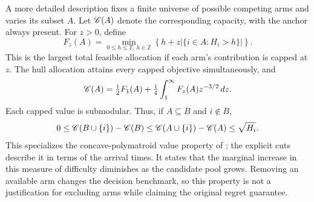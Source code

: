 A more detailed description fixes a finite universe of possible competing arms and varies its subset $A$. Let $\mathscr C(A)$ denote the corresponding capacity, with the anchor always present. For $z>0$, define
\begin{equation}\label{eq:cut-main}
 F_z(A)=\min_{0\le h\le T,\ h\in\mathbb Z}
 \left\{h+z|\{i\in A:H_i>h\}|\right\}.
\end{equation}
This is the largest total feasible allocation if each arm's contribution is capped at $z$. The hull allocation attains every capped objective simultaneously, and
\begin{equation}\label{eq:integral-main}
 \mathscr C(A)=\tfrac12F_1(A)+\tfrac14\int_1^\infty F_z(A)z^{-3/2}\,dz.
\end{equation}
Each capped value is submodular. Thus, if $A\subseteq B$ and $i\notin B$,
\[
 0\le\mathscr C(B\cup\{i\})-\mathscr C(B)
 \le\mathscr C(A\cup\{i\})-\mathscr C(A)\le\sqrt{H_i}.
\]
This specializes the concave-polymatroid value property of \citet{he2012polymatroid}; the explicit cuts describe it in terms of the arrival times. It states that the marginal increase in this measure of difficulty diminishes as the candidate pool grows. Removing an available arm changes the decision benchmark, so this property is not a justification for excluding arms while claiming the original regret guarantee.
